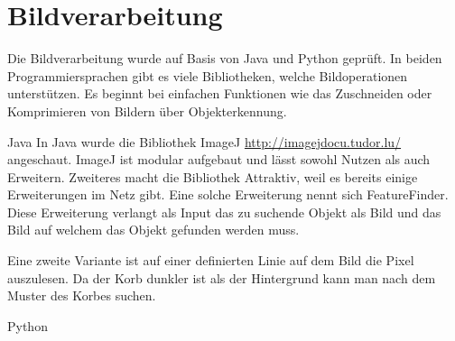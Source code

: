 \section{Bildverarbeitung}
Die Bildverarbeitung wurde auf Basis von Java und Python geprüft. In beiden Programmiersprachen gibt es viele Bibliotheken, welche Bildoperationen unterstützen. Es beginnt bei einfachen Funktionen wie das Zuschneiden oder Komprimieren von Bildern über Objekterkennung.

Java
In Java wurde die Bibliothek ImageJ \href{http://imagejdocu.tudor.lu/}{http://imagejdocu.tudor.lu/} angeschaut. ImageJ ist modular aufgebaut und lässt sowohl Nutzen als auch Erweitern. Zweiteres macht die Bibliothek Attraktiv, weil es bereits einige Erweiterungen im Netz gibt. Eine solche Erweiterung nennt sich FeatureFinder. Diese Erweiterung verlangt als Input das zu suchende Objekt als Bild und das Bild auf welchem das Objekt gefunden werden muss.

Eine zweite Variante ist auf einer definierten Linie auf dem Bild die Pixel auszulesen. Da der Korb dunkler ist als der Hintergrund kann man nach dem Muster des Korbes suchen.

Python


